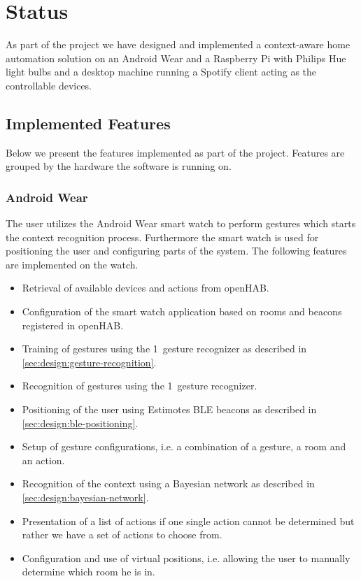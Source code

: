 \section{Status}
\label{sec:implementation:status}

As part of the project we have designed and implemented a context-aware home automation solution on an Android Wear and a Raspberry Pi with Philips Hue light bulbs and a desktop machine running a Spotify client acting as the controllable devices. 


\subsection{Implemented Features}

Below we present the features implemented as part of the project. Features are grouped by the hardware the software is running on.

\subsubsection{Android Wear}

The user utilizes the Android Wear smart watch to perform gestures which starts the context recognition process. Furthermore the smart watch is used for positioning the user and configuring parts of the system. The following features are implemented on the watch.

\begin{itemize}
\item Retrieval of available devices and actions from openHAB.
\item Configuration of the smart watch application based on rooms and beacons registered in openHAB.
\item Training of gestures using the 1\textcent~gesture recognizer as described in \cref{sec:design:gesture-recognition}.
\item Recognition of gestures using the 1\textcent~gesture recognizer.
\item Positioning of the user using Estimotes BLE beacons as described in \cref{sec:design:ble-positioning}.
\item Setup of gesture configurations, i.e. a combination of a gesture, a room and an action.
\item Recognition of the context using a Bayesian network as described in \cref{sec:design:bayesian-network}.
\item Presentation of a list of actions if one single action cannot be determined but rather we have a set of actions to choose from.
\item Configuration and use of virtual positions, i.e. allowing the user to manually determine which room he is in.
\end{itemize}

